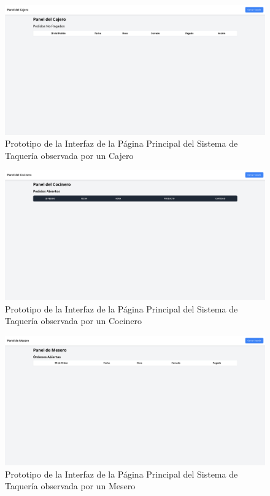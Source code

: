 \documentclass{article}
\begin{document}
\begin{figure}[H]
    \centering
    \includegraphics[width=1\textwidth]{img/cajero.png}
    \caption{Prototipo de la Interfaz de la Página Principal del Sistema de Taquería observada por un Cajero}
    \label{fig:prototipo_interfaz_cajero}
\end{figure}

\begin{figure}[H]
    \centering
    \includegraphics[width=1\textwidth]{img/cocinero.png}
    \caption{Prototipo de la Interfaz de la Página Principal del Sistema de Taquería observada por un Cocinero}
    \label{fig:prototipo_interfaz_cocinero}
\end{figure}

\begin{figure}[H]
    \centering
    \includegraphics[width=1\textwidth]{img/mesero.png}
    \caption{Prototipo de la Interfaz de la Página Principal del Sistema de Taquería observada por un Mesero}
    \label{fig:prototipo_interfaz_mesero}
\end{figure}
\end{document}

